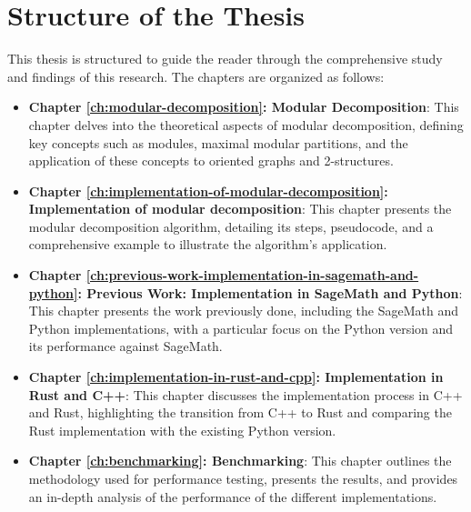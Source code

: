 \section{Structure of the Thesis}\label{sec:structure-of-the-thesis}

This thesis is structured to guide the reader through the comprehensive study and findings of this research.
The chapters are organized as follows:

\begin{itemize}
    \item \textbf{Chapter \ref{ch:modular-decomposition}: Modular Decomposition}: This chapter delves into the theoretical aspects of modular decomposition, defining key concepts such as modules, maximal modular partitions, and the application of these concepts to oriented graphs and 2-structures.
    \item \textbf{Chapter \ref{ch:implementation-of-modular-decomposition}: Implementation of modular decomposition}: This chapter presents the modular decomposition algorithm, detailing its steps, pseudocode, and a comprehensive example to illustrate the algorithm's application.
    \item \textbf{Chapter \ref{ch:previous-work-implementation-in-sagemath-and-python}: Previous Work: Implementation in SageMath and Python}: This chapter presents the work previously done, including the SageMath and Python implementations, with a particular focus on the Python version and its performance against SageMath.
    \item \textbf{Chapter \ref{ch:implementation-in-rust-and-cpp}: Implementation in Rust and C++}: This chapter discusses the implementation process in C++ and Rust, highlighting the transition from C++ to Rust and comparing the Rust implementation with the existing Python version.
    \item \textbf{Chapter \ref{ch:benchmarking}: Benchmarking}: This chapter outlines the methodology used for performance testing, presents the results, and provides an in-depth analysis of the performance of the different implementations.
\end{itemize}

